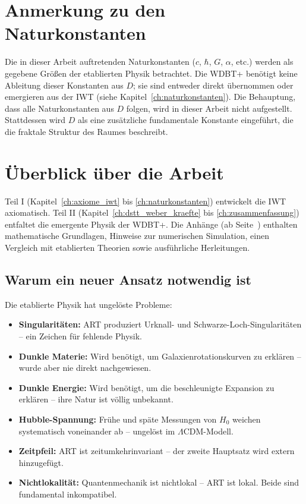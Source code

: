 \section{Anmerkung zu den Naturkonstanten}
\label{sec:naturkonstanten_hinweis}

Die in dieser Arbeit auftretenden Naturkonstanten (\( c \), \( \hbar \), \( G \), \( \alpha \), etc.) werden als gegebene Größen der etablierten Physik betrachtet. Die WDBT+ benötigt keine Ableitung dieser Konstanten aus \( D \); sie sind entweder direkt übernommen oder emergieren aus der IWT (siehe Kapitel~\ref{ch:naturkonstanten}). Die Behauptung, dass alle Naturkonstanten aus \( D \) folgen, wird in dieser Arbeit nicht aufgestellt. Stattdessen wird \( D \) als eine zusätzliche fundamentale Konstante eingeführt, die die fraktale Struktur des Raumes beschreibt.

\section{Überblick über die Arbeit}
\label{sec:ueberblick}

Teil I (Kapitel~\ref{ch:axiome_iwt} bis \ref{ch:naturkonstanten}) entwickelt die IWT axiomatisch. Teil II (Kapitel~\ref{ch:dstt_weber_kraefte} bis \ref{ch:zusammenfassung}) entfaltet die emergente Physik der WDBT+. Die Anhänge (ab Seite~\pageref{app:start}) enthalten mathematische Grundlagen, Hinweise zur numerischen Simulation, einen Vergleich mit etablierten Theorien sowie ausführliche Herleitungen.

\subsection{Warum ein neuer Ansatz notwendig ist}
\label{sub:warum_neu}

Die etablierte Physik hat ungelöste Probleme:

\begin{itemize}
    \item \textbf{Singularitäten:} ART produziert Urknall- und Schwarze-Loch-Singularitäten – ein Zeichen für fehlende Physik.
    \item \textbf{Dunkle Materie:} Wird benötigt, um Galaxienrotationskurven zu erklären – wurde aber nie direkt nachgewiesen.
    \item \textbf{Dunkle Energie:} Wird benötigt, um die beschleunigte Expansion zu erklären – ihre Natur ist völlig unbekannt.
    \item \textbf{Hubble-Spannung:} Frühe und späte Messungen von \( H_0 \) weichen systematisch voneinander ab – ungelöst im \( \Lambda \)CDM-Modell.
    \item \textbf{Zeitpfeil:} ART ist zeitumkehrinvariant – der zweite Hauptsatz wird extern hinzugefügt.
    \item \textbf{Nichtlokalität:} Quantenmechanik ist nichtlokal – ART ist lokal. Beide sind fundamental inkompatibel.
\end{itemize}

